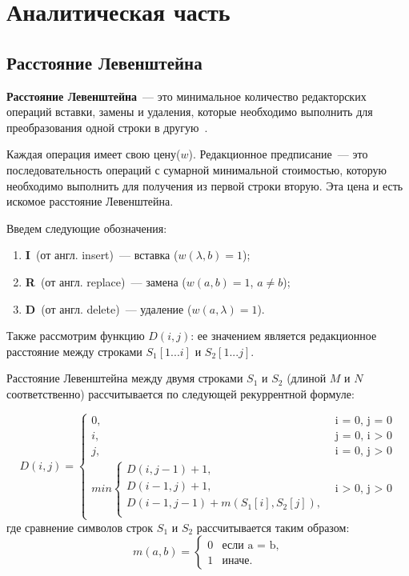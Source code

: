\chapter{Аналитическая часть}
\section{Расстояние Левенштейна}

\textbf{Расстояние Левенштейна}~--- это минимальное количество редакторских операций вставки, замены и удаления, которые необходимо выполнить для преобразования одной строки в другую~\cite{levenshtein}. 

Каждая операция имеет свою цену($w$). Редакционное предписание~--- это последовательность операций с сумарной минимальной стоимостью, которую необходимо выполнить для получения из первой строки вторую. Эта цена и есть искомое расстояние Левенштейна.

Введем следующие обозначения:
\begin{enumerate}[label=\arabic*)]
    \item \textbf{I}~(от англ. insert)~--- вставка ($w(\lambda, b) = 1$);
    \item \textbf{R}~(от англ. replace)~--- замена ($w(a, b) = 1$, $a \neq b$);
    \item \textbf{D}~(от англ. delete)~--- удаление ($w(a, \lambda) = 1$).
\end{enumerate}

Также рассмотрим функцию $D(i, j)$: ее значением является
редакционное расстояние между строками $S_1[1...i]$ и $S_2[1...j]$.

Расстояние Левенштейна между двумя строками $S_{1}$ и $S_{2}$ (длиной $M$ и $N$ соответственно) рассчитывается по следующей рекуррентной формуле:

\begin{equation}
	\label{eq:L}
	D(i, j) =
	\begin{cases}
		0, &\text{i = 0, j = 0}\\
		i, &\text{j = 0, i > 0}\\
		j, &\text{i = 0, j > 0}\\
		min \begin{cases}
			D(i, j - 1) + 1,\\
			D(i - 1, j) + 1,\\
			D(i - 1, j - 1) +  m(S_{1}[i], S_{2}[j]), \\
		\end{cases}
		&\text{i > 0, j > 0}
	\end{cases}
\end{equation}
где сравнение символов строк $S_1$ и $S_2$ рассчитывается таким образом:
\begin{equation}
	\label{eq:m}
	m(a, b) = \begin{cases}
		0 &\text{если a = b,}\\
		1 &\text{иначе.}
	\end{cases}
\end{equation}

